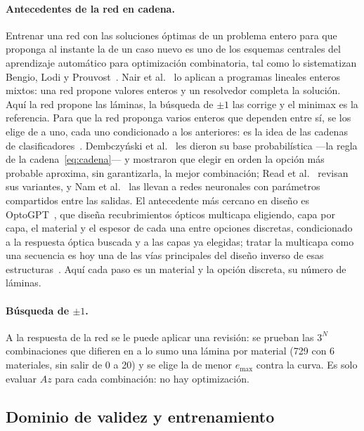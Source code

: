 \paragraph{Antecedentes de la red en cadena.} Entrenar una red con las soluciones óptimas de un problema entero para que proponga al instante la de un caso nuevo es uno de los esquemas centrales del aprendizaje automático para optimización combinatoria, tal como lo sistematizan Bengio, Lodi y Prouvost~\cite{bengiolodi}. Nair et al.~\cite{nair} lo aplican a programas lineales enteros mixtos: una red propone valores enteros y un resolvedor completa la solución. Aquí la red propone las láminas, la búsqueda de $\pm1$ las corrige y el minimax es la referencia. Para que la red proponga varios enteros que dependen entre sí, se los elige de a uno, cada uno condicionado a los anteriores: es la idea de las cadenas de clasificadores~\cite{read11}. Dembczy\'nski et al.~\cite{dembczynski} les dieron su base probabilística ---la regla de la cadena~\eqref{eq:cadena}--- y mostraron que elegir en orden la opción más probable aproxima, sin garantizarla, la mejor combinación; Read et al.~\cite{read21} revisan sus variantes, y Nam et al.~\cite{nam} las llevan a redes neuronales con parámetros compartidos entre las salidas. El antecedente más cercano en diseño es OptoGPT~\cite{optogpt}, que diseña recubrimientos ópticos multicapa eligiendo, capa por capa, el material y el espesor de cada una entre opciones discretas, condicionado a la respuesta óptica buscada y a las capas ya elegidas; tratar la multicapa como una secuencia es hoy una de las vías principales del diseño inverso de esas estructuras~\cite{ma2025}. Aquí cada paso es un material y la opción discreta, su número de láminas.

\paragraph{Búsqueda de $\pm1$.} A la respuesta de la red se le puede aplicar una revisión: se prueban las $3^N$ combinaciones que difieren en a lo sumo una lámina por material (729 con 6 materiales, sin salir de 0 a 20) y se elige la de menor $e_{\max}$ contra la curva. Es solo evaluar $Az$ para cada combinación: no hay optimización.

\subsection{Dominio de validez y entrenamiento}\label{sec:dominio}
